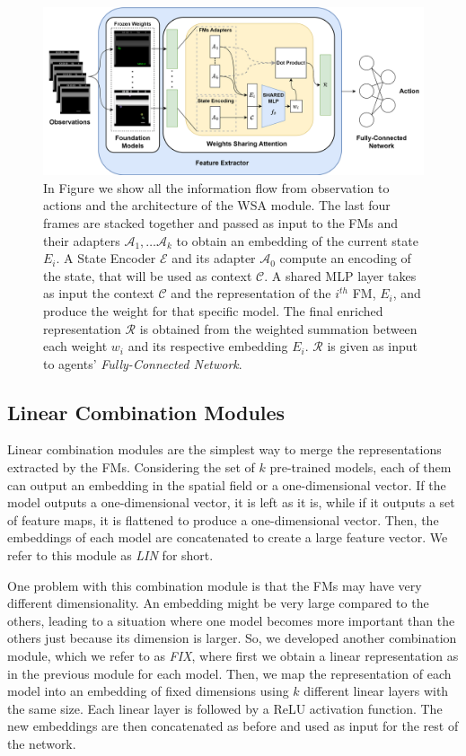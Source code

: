 \begin{figure}[ht]
    \begin{center}
        \includegraphics[width=1\textwidth]{images/main_architecture2}
    \end{center}
    \caption{In Figure we show all the information flow from observation to actions and the architecture of the WSA module. The last four frames are stacked together and passed as input to the FMs and their adapters $\mathcal{A}_1, \dots \mathcal{A}_k$ to obtain an embedding of the current state $E_i$. A State Encoder $\mathcal{E}$ and its adapter $\mathcal{A}_0$ compute an encoding of the state, that will be used as context $\mathcal{C}$. A shared MLP layer takes as input the context $\mathcal{C}$ and the representation of the $i^{th}$ FM, $E_i$, and produce the weight for that specific model. The final enriched representation $\mathcal{R}$ is obtained from the weighted summation between each weight $w_i$ and its respective embedding $E_i$. $\mathcal{R}$ is given as input to agents' \textit{Fully-Connected Network}.}
    \label{fig:main_architecture}
\end{figure}

\subsection{Linear Combination Modules}
\label{subsec:linear_combination}
Linear combination modules are the simplest way to merge the representations extracted by the FMs.
Considering the set of $k$ pre-trained models, each of them can output an embedding in the spatial field or a one-dimensional vector.
If the model outputs a one-dimensional vector, it is left as it is, while if it outputs a set of feature maps, it is flattened to produce a one-dimensional vector.
Then, the embeddings of each model are concatenated to create a large feature vector.
We refer to this module as \textit{LIN} for short.


One problem with this combination module is that the FMs may have very different dimensionality.
An embedding might be very large compared to the others, leading to a situation where one model becomes more important than the others just because its dimension is larger.
So, we developed another combination module, which we refer to as \textit{FIX}, where first we obtain a linear representation as in the previous module for each model.
Then, we map the representation of each model into an embedding of fixed dimensions using $k$ different linear layers with the same size.
Each linear layer is followed by a ReLU activation function.
The new embeddings are then concatenated as before and used as input for the rest of the network.

